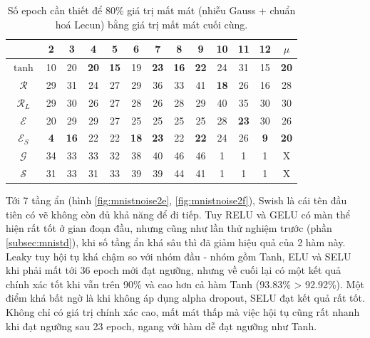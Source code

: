 \begin{table}[ht!]
\centering
\def\arraystretch{1.3}
\begin{tabular}{c|c|c|c|c|c|c|c|c|c|c|c|c|}
\cline{2-13}
                        & 2  & 3  & 4  & 5  & 6  & 7  & 8  & 9  & 10 & 11 & 12 & $\mu$ \\ \hline
\multicolumn{1}{|c|}{$\tanh$} & 10 & 20 & \textbf{20} & \textbf{15} & 19 & \textbf{23} & \textbf{16} & \textbf{22} & 24 & 31 & 15 & \textbf{20}\\ \hline
\multicolumn{1}{|c|}{$\mathcal{R}$} & 29 & 31 & 24 & 27 & 29 & 36 & 33 & 41 & \textbf{18} & 26 & 16 & 28\\ \hline
\multicolumn{1}{|c|}{$\mathcal{R}_L$} & 29 & 30 & 26 & 27 & 28 & 26 & 28 & 29 & 40 & 35 & 30 & 30\\ \hline
\multicolumn{1}{|c|}{$\mathcal{E}$} & 20 & 29 & 29 & 27 & 25 & 25 & 25 & 25 & 28 & \textbf{23} & 30 & 26\\ \hline
\multicolumn{1}{|c|}{$\mathcal{E}_S$} & \textbf{4}  & \textbf{16} & 22 & 22 & \textbf{18} & \textbf{23} & 22 & \textbf{22} & 24 & 26 & \textbf{9}  & \textbf{20}\\ \hline
\multicolumn{1}{|c|}{$\mathcal{G}$} & 34 & 33 & 33 & 32 & 38 & 40 & 46 & 46 & 1  & 1  & 1  & X\\ \hline
\multicolumn{1}{|c|}{$\mathcal{S}$} & 31 & 33 & 31 & 33 & 39 & 39 & 44 & 41 & 1  & 1  & 1  & X\\ \hline
\end{tabular}
\caption{Số epoch cần thiết để 80\% giá trị mất mát (nhiễu Gauss + chuẩn hoá Lecun) bằng giá trị mất mát cuối cùng.}
\label{tab:mnistnoiseepoch}
\end{table}

Tới 7 tầng ẩn (hình \ref{fig:mnistnoise2e}, \ref{fig:mnistnoise2f}), Swish là cái tên đầu tiên có vẽ không còn đủ khả năng để đi tiếp.
Tuy RELU và GELU có màn thể hiện rất tốt ở gian đoạn đầu, nhưng cũng như lần thử nghiệm trước (phần \ref{subsec:mnistd}), khi số tầng ẩn khá sâu thì đã giảm hiệu quả của 2 hàm này.
Leaky tuy hội tụ khá chậm so với nhóm đầu - nhóm gồm Tanh, ELU và SELU khi phải mất tới 36 epoch mới đạt ngưỡng, nhưng về cuối lại có một kết quả chính xác tốt khi vẫn trên 90\% và cao hơn cả hàm Tanh (93.83\% > 92.92\%).
Một điểm khá bất ngờ là khi không áp dụng alpha dropout, SELU đạt kết quả rất tốt.
Không chỉ có giá trị chính xác cao, mất mát thấp mà việc hội tụ cũng rất nhanh khi đạt ngưỡng sau 23 epoch, ngang với hàm dễ đạt ngưỡng như Tanh.
\vspace{5pt}


